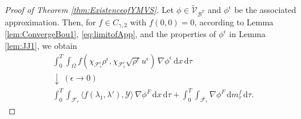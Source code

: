 \documentclass[11pt,twoside,reqno]{amsart}
\numberwithin{equation}{section}
\numberwithin{figure}{section}
\begin{document}
\begin{proof}[Proof of Theorem \ref{thm:ExistenceofYMVS}]
Let $\phi\in\tilde{\mathcal{V}}_{\mathcal{B}^T}$ and $\phi^\epsilon$ be the associated approximation. Then, for $f\in C_{\gamma,2}$ with $f(0,0)=0$, 
according to Lemma \ref{lem:ConvergeBou1}, \eqref{eq:limitofApp}, and the properties of $\phi^\epsilon$ in Lemma \ref{lem:JJ1}, we obtain
\begin{equation}\label{eq:momentumConvergence1}
\begin{gathered}
\int_0^T\int_{\Omega} f(\chi_{\mathcal{F}^{\epsilon}_\tau}\rho^\epsilon,\chi_{\mathcal{F}^{\epsilon}_\tau}\sqrt{\rho^\epsilon}u^\epsilon)\,\nabla\phi^\epsilon\,\mathrm{d}x\,\mathrm{d}\tau \\[6pt]
\downarrow\ (\epsilon\to0) \\[6pt]
\int_0^T\int_{\mathcal{F}_\tau}\!\langle f(\lambda_1,\lambda'),\mathcal{Y}\rangle\,\nabla\phi^F\,\mathrm{d}x\,\mathrm{d}\tau
+\int_0^T\int_{\overline{\mathcal{F}_\tau}}\!\nabla\phi^F\,\mathrm{d}m^f_\tau\,\mathrm{d}\tau.
\end{gathered}
\end{equation}

\end{proof}
\end{document}
